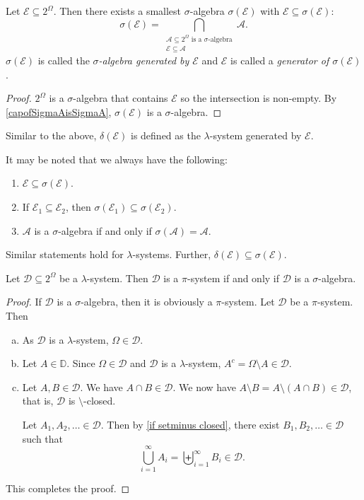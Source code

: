 \begin{theorem}
    Let $\mathcal{E}\subseteq2^\Omega$. Then there exists a smallest $\sigma$-algebra $\sigma(\mathcal{E})$ with $\mathcal{E}\subseteq\sigma(\mathcal{E})$:
    $$\sigma(\mathcal{E})=\bigcap_{\substack{\mathcal{A}\subseteq2^\Omega\text{ is a $\sigma$-algebra} \\ \mathcal{E}\subseteq\mathcal{A}}}\mathcal{A}.$$
    $\sigma(\mathcal{E})$ is called the \textit{$\sigma$-algebra generated by $\mathcal{E}$} and $\mathcal{E}$ is called a \textit{generator of $\sigma(\mathcal{E})$}. 
\end{theorem}
\begin{proof}
    $2^\Omega$ is a $\sigma$-algebra that contains $\mathcal{E}$ so the intersection is non-empty. By \ref{capofSigmaAisSigmaA}, $\sigma(\mathcal{E})$ is a $\sigma$-algebra.
\end{proof}

Similar to the above, $\delta(\mathcal{E})$ is defined as the $\lambda$-system generated by $\mathcal{E}$.

\vspace{2mm}
It may be noted that we always have the following:
\begin{enumerate}
    \item $\mathcal{E}\subseteq \sigma(\mathcal{E})$.
    \item If $\mathcal{E}_1\subseteq\mathcal{E}_2$, then $\sigma(\mathcal{E}_1)\subseteq\sigma(\mathcal{E}_2)$.
    \item $\mathcal{A}$ is a $\sigma$-algebra if and only if $\sigma(\mathcal{A})=\mathcal{A}$.
\end{enumerate}
Similar statements hold for $\lambda$-systems. Further, $\delta(\mathcal{E})\subseteq\sigma(\mathcal{E})$.

\begin{theorem}
\label{cap closed lam sys}
    Let $\mathcal{D}\subseteq2^\Omega$ be a $\lambda$-system. Then $\mathcal{D}$ is a $\pi$-system if and only if $\mathcal{D}$ is a $\sigma$-algebra.
\end{theorem}
\begin{proof}
    If $\mathcal{D}$ is a $\sigma$-algebra, then it is obviously a $\pi$-system. Let $\mathcal{D}$ be a $\pi$-system. Then
    \begin{enumerate}[(a)]
        \item As $\mathcal{D}$ is a $\lambda$-system, $\Omega\in\mathcal{D}$.
        \item Let $A\in\mathbb{D}$. Since $\Omega\in\mathcal{D}$ and $\mathcal{D}$ is a $\lambda$-system, $A^c=\Omega\setminus A\in\mathcal{D}$.
        \item Let $A,B\in\mathcal{D}$. We have $A\cap B\in\mathcal{D}$. We now have $A\setminus B = A\setminus (A\cap B)\in\mathcal{D}$, that is, $\mathcal{D}$ is $\setminus$-closed.
        
        Let $A_1,A_2,\ldots\in\mathcal{D}$. Then by \ref{if setminus closed}, there exist $B_1,B_2,\ldots\in\mathcal{D}$ such that
        $$\bigcup_{i=1}^\infty A_i=\biguplus_{i=1}^\infty B_i\in\mathcal{D}.$$
    \end{enumerate}
    This completes the proof.
\end{proof}

